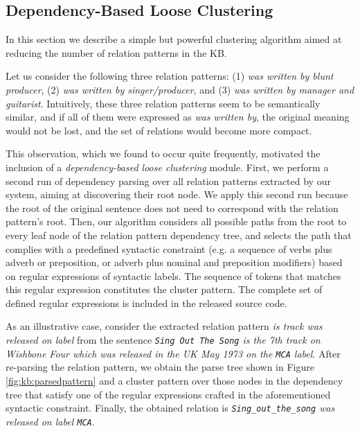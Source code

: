 \subsection{Dependency-Based Loose Clustering}
\label{sec:kb:method:clustering}

In this section we describe a simple but powerful clustering algorithm aimed at reducing the number of relation patterns in the \textsc{KB}. %

Let us consider the following three relation patterns: (1) \textit{was written by blunt producer}, (2) \textit{was written by singer/producer}, and (3) \textit{was written by manager and guitarist}. Intuitively, these three relation patterns seem to be semantically similar, and if all of them were expressed as \textit{was written by}, the original meaning would not be lost, and the set of relations would become more compact.

This observation, which we found to occur quite frequently, motivated the inclusion of a \textit{dependency-based loose clustering} module. First, we perform a second run of dependency parsing over all relation patterns extracted by our system, aiming at discovering their root node. We apply this second run because the root of the original sentence does not need to correspond with the relation pattern's root. Then, our algorithm considers all possible paths from the root to every leaf node of the relation pattern dependency tree, and selects the path that complies with a predefined syntactic constraint (e.g. a sequence of verbs plus adverb or preposition, or adverb plus nominal and preposition modifiers) based on regular expressions of syntactic labels. The sequence of tokens that matches this regular expression constitutes the cluster pattern. The complete set of defined regular expressions is included in the released source code.

As an illustrative case, consider the extracted relation pattern \textit{is track was released on label} from the sentence \textit{\texttt{Sing Out The Song} is the 7th track on Wishbone Four which was released in the UK May 1973 on the \texttt{MCA} label}. After re-parsing the relation pattern, we obtain the parse tree shown in Figure \ref{fig:kb:parsedpattern} and a cluster pattern over those nodes in the dependency tree that satisfy one of the regular expressions crafted in the aforementioned syntactic constraint. Finally, the obtained relation is \textit{\texttt{Sing\_out\_the\_song} was released on label \texttt{MCA}}.

